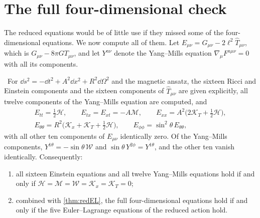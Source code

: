 \section{The full four-dimensional check}

The reduced equations would be of little use if they missed some of the four-dimensional equations. We now compute all of them. Let $E_{\mu\nu}=G_{\mu\nu}-2\ell^2\hat T_{\mu\nu}$, which is $G_{\mu\nu}-8\pi GT_{\mu\nu}$, and let $Y^{a\nu}$ denote the Yang--Mills equation $\nabla_\mu F^{a\mu\nu}=0$ with all its components.

\begin{theorem}\label{thm:4dcheck}\ver\
For $\dd s^2=-\dd t^2+A^2\dd x^2+R^2\dd\Omega^2$ and the magnetic ansatz, the sixteen Ricci and Einstein components and the sixteen components of $\hat T_{\mu\nu}$ are given explicitly, all twelve components of the Yang--Mills equation are computed, and
\[
\begin{gathered}E_{tt}=\tfrac12\mathcal H,\qquad E_{tx}=E_{xt}=-A\mathcal M,\qquad E_{xx}=A^2\bigl(2\mathcal K_T+\tfrac12\mathcal H\bigr),\\ E_{\theta\theta}=R^2\bigl(\mathcal K_x+\mathcal K_T+\tfrac12\mathcal H\bigr),\qquad E_{\phi\phi}=\sin^2\theta\,E_{\theta\theta},\end{gathered}
\]
with all other ten components of $E_{\mu\nu}$ identically zero. Of the Yang--Mills components, $Y^{1\theta}=-\sin\theta\,\mathcal W$ and $\sin\theta\,Y^{2\phi}=Y^{1\theta}$, and the other ten vanish identically. Consequently:
\begin{enumerate}[label=(\roman*)]
\item all sixteen Einstein equations and all twelve Yang--Mills equations hold if and only if $\mathcal H=\mathcal M=\mathcal W=\mathcal K_x=\mathcal K_T=0$;
\item combined with \cref{thm:redEL}, the full four-dimensional equations hold if and only if the five Euler--Lagrange equations of the reduced action hold.
\end{enumerate}
\end{theorem}
